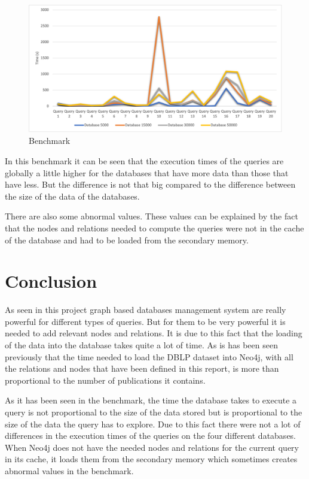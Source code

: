 \documentclass{article}
\begin{document}
\begin{figure}[H] 
\begin{adjustwidth}{-2cm}{-1cm}
 \begin{center}
\includegraphics[width=20cm]{benchmark.png}
\end{center}
\caption{Benchmark}
\end{adjustwidth}
\end{figure}

In this benchmark it can be seen that the execution times of the queries are globally a little higher for the databases that have more data than those that have less. But the difference is not that big compared to the difference between the size of the data of the databases.

There are also some abnormal values. These values can be explained by the fact that the nodes and relations needed to compute the queries were not in the cache of the database and had to be loaded from the secondary memory.


\section{Conclusion}
As seen in this project graph based databases management system are really powerful for different types of queries. But for them to be very powerful it is needed to add relevant nodes and relations. It is due to this fact that the loading of the data into the database takes quite a lot of time. As is has been seen previously that the time needed to load the DBLP dataset into Neo4j, with all the relations and nodes that have been defined in this report, is more than proportional to the number of publications it contains.

As it has been seen in the benchmark, the time the database takes to execute a query is not proportional to the size of the data stored but is proportional to the size of the data the query has to explore. Due to this fact there were not a lot of differences in the execution times of the queries on the four different databases. When Neo4j does not have the needed nodes and relations for the current query in its cache, it loads them from the secondary memory which sometimes creates abnormal values in the benchmark.
\end{document}
